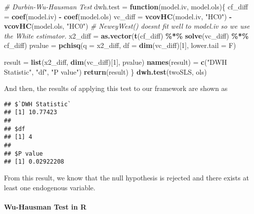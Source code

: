 \documentclass[
  12pt,
]{article}
\newenvironment{Shaded}{\begin{snugshade}}{\end{snugshade}}
\newcommand{\CommentTok}[1]{\textcolor[rgb]{0.56,0.35,0.01}{\textit{#1}}}
\newcommand{\ControlFlowTok}[1]{\textcolor[rgb]{0.13,0.29,0.53}{\textbf{#1}}}
\newcommand{\DataTypeTok}[1]{\textcolor[rgb]{0.13,0.29,0.53}{#1}}
\newcommand{\DecValTok}[1]{\textcolor[rgb]{0.00,0.00,0.81}{#1}}
\newcommand{\KeywordTok}[1]{\textcolor[rgb]{0.13,0.29,0.53}{\textbf{#1}}}
\newcommand{\NormalTok}[1]{#1}
\newcommand{\OperatorTok}[1]{\textcolor[rgb]{0.81,0.36,0.00}{\textbf{#1}}}
\newcommand{\StringTok}[1]{\textcolor[rgb]{0.31,0.60,0.02}{#1}}
\begin{document}
\begin{Shaded}
\begin{Highlighting}[]
\CommentTok{\# Durbin{-}Wu{-}Hausman Test}
\NormalTok{dwh.test =}\StringTok{ }\ControlFlowTok{function}\NormalTok{(model.iv, model.ols)\{}
\NormalTok{    cf\_diff =}\StringTok{ }\KeywordTok{coef}\NormalTok{(model.iv) }\OperatorTok{{-}}\StringTok{ }\KeywordTok{coef}\NormalTok{(model.ols)}
\NormalTok{    vc\_diff =}\StringTok{ }\KeywordTok{vcovHC}\NormalTok{(model.iv, }\StringTok{"HC0"}\NormalTok{) }\OperatorTok{{-}}\StringTok{ }\KeywordTok{vcovHC}\NormalTok{(model.ols, }\StringTok{"HC0"}\NormalTok{) }
    \CommentTok{\# NeweyWest() doesn\textquotesingle{}t fit well to model.iv so we use the White estimator.}
\NormalTok{    x2\_diff =}\StringTok{ }\KeywordTok{as.vector}\NormalTok{(}\KeywordTok{t}\NormalTok{(cf\_diff) }\OperatorTok{\%*\%}\StringTok{ }\KeywordTok{solve}\NormalTok{(vc\_diff) }\OperatorTok{\%*\%}\StringTok{ }\NormalTok{cf\_diff)}
\NormalTok{    pvalue =}\StringTok{ }\KeywordTok{pchisq}\NormalTok{(}\DataTypeTok{q =}\NormalTok{ x2\_diff, }\DataTypeTok{df =} \KeywordTok{dim}\NormalTok{(vc\_diff)[}\DecValTok{1}\NormalTok{], }\DataTypeTok{lower.tail =}\NormalTok{ F)}
    
\NormalTok{    result =}\StringTok{ }\KeywordTok{list}\NormalTok{(x2\_diff, }\KeywordTok{dim}\NormalTok{(vc\_diff)[}\DecValTok{1}\NormalTok{], pvalue)}
    \KeywordTok{names}\NormalTok{(result) =}\StringTok{ }\KeywordTok{c}\NormalTok{(}\StringTok{"DWH Statistic"}\NormalTok{, }\StringTok{"df"}\NormalTok{, }\StringTok{"P value"}\NormalTok{)}
    \KeywordTok{return}\NormalTok{(result)}
\NormalTok{\}}
\KeywordTok{dwh.test}\NormalTok{(twoSLS, ols)}
\end{Highlighting}
\end{Shaded}

And then, the results of applying this test to our framework are shown as

\begin{verbatim}
## $`DWH Statistic`
## [1] 10.77423
## 
## $df
## [1] 4
## 
## $P value
## [1] 0.02922208
\end{verbatim}

From this result, we know that the null hypothesis is rejected and there exists at least one endogenous variable.

\hypertarget{wu-hausman-test-in-r}{%
\paragraph{Wu-Hausman Test in R}\label{wu-hausman-test-in-r}}
\end{document}
